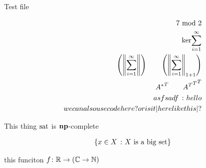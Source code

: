 \documentclass[12pt]{article}
\begin{document}
Test file

\begin{align*}
  7 \mod 2 \\
  \ker{\sum_{i = 1}^\infty} \\
  \parens{\norm{\sum_{i = 1}^\infty}} \qquad
    \parens{\norm{\sum_{i = 1}^\infty}_{1 + 1}} \\
  \transp{\adj{A}} \qquad \transp{\transp{\transp{A}}} \\
  asfsadf \st hello \\
  we can also use \pinl{code here?} or is it \pinl|here like this|?
\end{align*}

This thing $\text{sat}$ is $\mathbf{np}$-complete

\begin{align*}
  \left\{x \in X \ \colon \text{$X$ is a big set}\right\}
\end{align*}

this funciton $f \colon \mathbb{R} \to \left(\mathbb{C} \to \mathbb{N}\right)$
\end{document}
